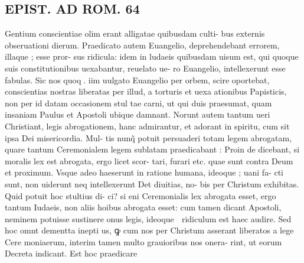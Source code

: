 \documentclass{article}
\begin{document}
\begin{pages}
\section*{EPIST. AD ROM.  64 }
\marginpar{[ p.]}\pstart Gentium conscientiae olim erant alligatae quibusdam culti- bus externis obseruationi dierum. Praedicato autem Euangelio, deprehendebant errorem, illaque ; esse pror- sus ridicula: idem in ludaeis quibusdam uisum est, qui quoque suis constitutionibus uexabantur, reuelato ue- ro Euangelio, intellexerunt esse fabulas. Sic nos quoq.  iim uulgato Euangelio per orbem, scire oportebat, conscientias nostras liberatas per illud, a torturis et uexa ationibus Papisticis, non per id datam occasionem stul tae carni, ut qui duis praesumat, quam insaniam Paulus et Apostoli ubique damnant. Norunt autem tantum ueri Christiant, legis abrogationem, hanc admirantur, et adorant in spiritu, cum sit ipsa Dei misericordia. Mul- tis nunq̃ potuit persuaderi totam legem abrogatam, quare tantum Ceremonialem legem sublatam praedicabant : Proin de dicebant, si moralis lex est abrogata, ergo licet scor- tari, furari etc. quae sunt contra Deum et proximum.  Vsque adeo haeserunt in ratione humana, ideoque ; uani fa- cti sunt, non uiderunt neq intellexerunt Det diuitias, no- bis per Christum exhibitas. Quid potuit hoc stultius di- ci? si eni Ceremonialis lex abrogata esset, ergo tantum Iudaeis, non aliis hoibus abrogata esset: cum tamen dicant Apostoli, neminem potuisse sustinere onus legis, ideoque  ridiculum est haec audire. Sed hoc omnt dementta inepti us, ꝙ cum nos per Christum asserant liberatos a lege Cere moniaerum, interim tamen multo grauioribus nos onera- rint, ut eorum Decreta indicant. Est hoc praedicare  \pend

\end{pages}
\end{document}
